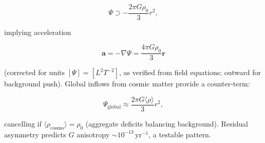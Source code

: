 \[
\Psi \supset -\frac{2\pi G \rho_0}{3} r^2,
\]

implying acceleration

\begin{equation}
\mathbf{a} = -\nabla \Psi = \frac{4\pi G \rho_0}{3} \mathbf{r}
\end{equation}

(corrected for units $[\Psi] = [L^2 T^{-2}]$, as verified from field equations; outward for background push). Global inflows from cosmic matter provide a counter-term:

\begin{equation}
\Psi_{\text{global}} \approx \frac{2\pi G \langle \rho \rangle}{3} r^2,
\end{equation}

cancelling if $\langle \rho_\text{cosmo} \rangle = \rho_0$ (aggregate deficits balancing background). Residual asymmetry predicts $G$ anisotropy $\sim 10^{-13} \, \mathrm{yr}^{-1}$, a testable pattern.

\medskip
\noindent
{}

\medskip
